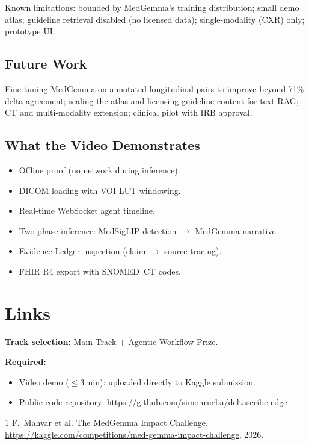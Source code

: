 \documentclass[10pt,twocolumn]{article}
\begin{document}
Known limitations: bounded by MedGemma's training distribution; small demo atlas; guideline retrieval disabled (no licensed data); single-modality (CXR) only; prototype UI.

\subsection{Future Work}

Fine-tuning MedGemma on annotated longitudinal pairs to improve beyond 71\% delta agreement; scaling the atlas and licensing guideline content for text RAG; CT and multi-modality extension; clinical pilot with IRB approval.

\subsection{What the Video Demonstrates}

\begin{itemize}
  \item Offline proof (no network during inference).
  \item DICOM loading with VOI LUT windowing.
  \item Real-time WebSocket agent timeline.
  \item Two-phase inference: MedSigLIP detection $\rightarrow$ MedGemma narrative.
  \item Evidence Ledger inspection (claim $\rightarrow$ source tracing).
  \item FHIR R4 export with SNOMED~CT codes.
\end{itemize}

\section{Links}
\label{sec:links}

\noindent\textbf{Track selection:} Main Track + Agentic Workflow Prize.

\smallskip
\noindent\textbf{Required:}
\begin{itemize}
  \item Video demo ($\leq$3\,min): uploaded directly to Kaggle submission.
  \item Public code repository: \url{https://github.com/simonrueba/deltascribe-edge}
\end{itemize}


\begin{thebibliography}{1}
\small
{}
F.~Mahvar et al.
\newblock The {MedGemma} Impact Challenge.
\newblock \url{https://kaggle.com/competitions/med-gemma-impact-challenge}, 2026.
\end{thebibliography}
\end{document}
